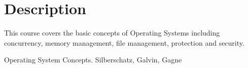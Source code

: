 \documentclass{syllabus}
\begin{document}
\section*{Description}
This course covers the basic concepts of Operating Systems including concurrency, memory management, file management, protection and security.

\begin{text}{Operating System Concepts. Silberschatz, Galvin, Gagne}
\end{text}

\begin{grading}
\end{grading}


\cheating

\ada
\end{document}

